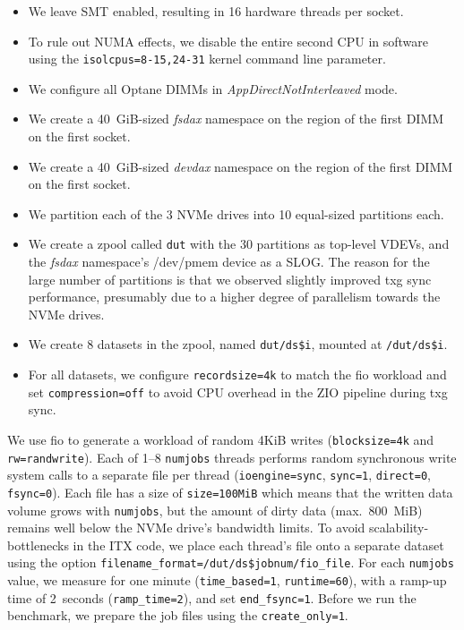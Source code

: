 \documentclass[12pt,a4paper,twoside]{book}
\begin{document}
\begin{itemize}[noitemsep]
    \item We leave SMT enabled, resulting in 16 hardware threads per socket.
    \item To rule out NUMA effects, we disable the entire second CPU in software using the \lstinline{isolcpus=8-15,24-31} kernel command line parameter.
    \item We configure all Optane DIMMs in \textit{AppDirectNotInterleaved} mode.
    \item We create a 40~GiB-sized \textit{fsdax} namespace on the region of the first DIMM on the first socket.
    \item We create a 40~GiB-sized \textit{devdax} namespace on the region of the first DIMM on the first socket.
    \item We partition each of the 3 NVMe drives into 10 equal-sized partitions each.
    \item We create a zpool called \texttt{dut} with the 30 partitions as top-level VDEVs, and the \textit{fsdax} namespace's /dev/pmem device as a SLOG.
        The reason for the large number of partitions is that we observed slightly improved txg sync performance, presumably due to a higher degree of parallelism towards the NVMe drives.
    \item We create 8 datasets in the zpool, named \lstinline{dut/ds$i}, mounted at \lstinline{/dut/ds$i}.
    \item For all datasets, we configure \lstinline{recordsize=4k} to match the fio workload and set \lstinline{compression=off} to avoid CPU overhead in the ZIO pipeline during txg sync.
\end{itemize}

We use fio to generate a workload of random 4KiB writes (\lstinline{blocksize=4k} and \lstinline{rw=randwrite}).
Each of 1--8 \lstinline{numjobs} threads performs random synchronous write system calls to a separate file per thread (\lstinline{ioengine=sync}, \lstinline{sync=1}, \lstinline{direct=0}, \lstinline{fsync=0}).
Each file has a size of \lstinline{size=100MiB} which means that the written data volume grows with \lstinline{numjobs}, but the amount of dirty data (max.~800~MiB) remains well below the NVMe drive's bandwidth limits.
To avoid scalability-bottlenecks in the ITX code, we place each thread's file onto a separate dataset using the option \lstinline{filename_format=/dut/ds$jobnum/fio_file}.
For each \lstinline{numjobs} value, we measure for one minute (\lstinline{time_based=1}, \lstinline{runtime=60}), with a ramp-up time of 2~seconds (\lstinline{ramp_time=2}), and set \lstinline{end_fsync=1}.
Before we run the benchmark, we prepare the job files using the \lstinline{create_only=1}.
\end{document}
